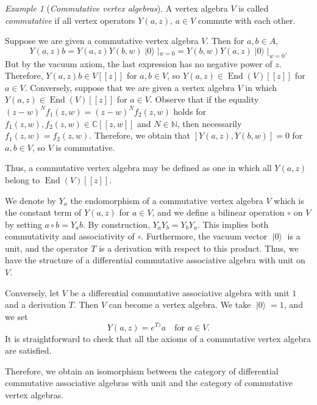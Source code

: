 \documentclass[a4paper, 12pt, reqno]{amsart}
\theoremstyle{remark}
\newtheorem{example}[theorem]{Example}
\numberwithin{equation}{subsection}
\DeclareMathOperator{\End}{End}
\DeclareMathOperator{\vac}{|0\rangle}
\begin{document}
\begin{example}[\emph{Commutative vertex algebras}]
  \label{exa:4}
  A vertex algebra $V$ is called \emph{commutative} if all vertex operators $Y(a, z)$, $a \in V$ commute with each other.

  Suppose we are given a commutative vertex algebra $V$.
  Then for $a, b \in A$,
  \begin{equation*}
    Y(a, z)b = Y(a, z)Y(b, w)\vac|_{w = 0} = Y(b, w)Y(a, z)\vac|_{w = 0}.
  \end{equation*}
  But by the vacuum axiom, the last expression has no negative power of $z$.
  Therefore, $Y(a, z)b \in V[[z]]$ for $a, b \in V$, so $Y(a, z) \in \End(V)[[z]]$ for $a \in V$.
  Conversely, suppose that we are given a vertex algebra $V$ in which $Y(a, z) \in \End(V)[[z]]$ for $a \in V$.
  Observe that if the equality $(z - w)^Nf_1(z, w) = (z - w)^Nf_2(z, w)$ holds for $f_1(z, w), f_2(z, w) \in \mathbb{C}[[z, w]]$ and $N \in \mathbb{N}$, then necessarily $f_1(z, w) = f_2(z, w)$.
  Therefore, we obtain that $[Y(a, z), Y(b, w)] = 0$ for $a, b \in V$, so $V$ is commutative.

  Thus, a commutative vertex algebra may be defined as one in which all $Y(a, z)$ belong to $\End(V)[[z]]$.

  We denote by $Y_a$ the endomorphism of a commutative vertex algebra $V$ which is the constant term of $Y(a, z)$ for $a \in V$, and we define a bilinear operation $\circ$ on $V$ by setting $a\circ b = Y_ab$.
  By construction, $Y_aY_b = Y_bY_a$.
  This implies both commutativity and associativity of $\circ$.
  Furthermore, the vacuum vector $\vac$ is a unit, and the operator $T$ is a derivation with respect to this product.
  Thus, we have the structure of a differential commutative associative algebra with unit on $V$.

  Conversely, let $V$ be a differential commutative associative algebra with unit $1$ and a derivation $T$.
  Then $V$ can become a vertex algebra.
  We take $\vac = 1$, and we set
  \begin{equation*}
    Y(a, z) = e^{Tz}a \quad \text{for }a \in V.
  \end{equation*}
  It is straightforward to check that all the axioms of a commutative vertex algebra are satisfied.

  Therefore, we obtain an isomorphism between the category of differential commutative associative algebras with unit and the category of commutative vertex algebras.
\end{example}
\end{document}

